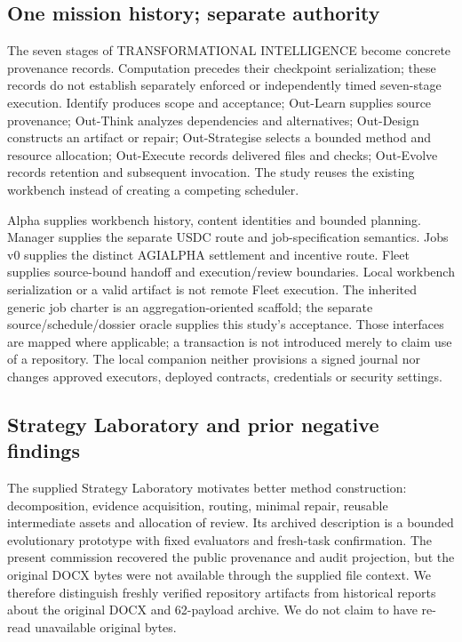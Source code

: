 \documentclass[11pt,a4paper]{article}
\begin{document}
\subsection{One mission history; separate authority}
The seven stages of TRANSFORMATIONAL INTELLIGENCE become concrete provenance records. Computation precedes their checkpoint serialization; these records do not establish separately enforced or independently timed seven-stage execution. Identify produces scope and acceptance; Out-Learn supplies source provenance; Out-Think analyzes dependencies and alternatives; Out-Design constructs an artifact or repair; Out-Strategise selects a bounded method and resource allocation; Out-Execute records delivered files and checks; Out-Evolve records retention and subsequent invocation. The study reuses the existing workbench instead of creating a competing scheduler.\citep{transformational,alpha_source}

Alpha supplies workbench history, content identities and bounded planning. Manager supplies the separate USDC route and job-specification semantics. Jobs v0 supplies the distinct AGIALPHA settlement and incentive route. Fleet supplies source-bound handoff and execution/review boundaries. Local workbench serialization or a valid artifact is not remote Fleet execution. The inherited generic job charter is an aggregation-oriented scaffold; the separate source/schedule/dossier oracle supplies this study's acceptance. Those interfaces are mapped where applicable; a transaction is not introduced merely to claim use of a repository. The local companion neither provisions a signed journal nor changes approved executors, deployed contracts, credentials or security settings.\citep{manager_source,jobs_source,fleet_source}



\subsection{Strategy Laboratory and prior negative findings}
The supplied Strategy Laboratory motivates better method construction: decomposition, evidence acquisition, routing, minimal repair, reusable intermediate assets and allocation of review. Its archived description is a bounded evolutionary prototype with fixed evaluators and fresh-task confirmation. The present commission recovered the public provenance and audit projection, but the original DOCX bytes were not available through the supplied file context. We therefore distinguish freshly verified repository artifacts from historical reports about the original DOCX and 62-payload archive. We do not claim to have re-read unavailable original bytes.\citep{strategy_history}
\end{document}
